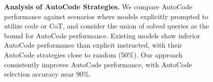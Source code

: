 
\begin{figure}[t]
    \centering %
    \caption{\small \textbf{Analysis of AutoCode Strategies. }\small We compare AutoCode performance against scenarios where models explicitly prompted to utilize code or CoT, and consider the union of solved queries as the bound for AutoCode performance. Existing models show inferior AutoCode performance than explicit instructed, with their AutoCode strategies close to random (50\%). Our approach consistently improves AutoCode performance, with AutoCode selection accuracy near 90\%.  } 
    \label{fig_learned_behavior} 
\end{figure}